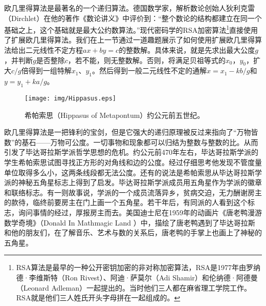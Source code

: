 \documentclass[UTF8]{article}
\begin{document}
欧几里得算法是最著名的一个递归算法。德国数学家，解析数论创始人狄利克雷（Dirchlet）在他的著作《数论讲义》中评价到：“整个数论的结构都建立在同一个基础之上，这个基础就是最大公约数算法。”现代密码学的RSA加密算法\footnote{RSA算法是最早的一种公开密钥加密的非对称加密算法，RSA是1977年由罗纳德·李维斯特（Ron Rivest）、阿迪·萨莫尔（Adi Shamir）和伦纳德·阿德曼（Leonard Adleman）一起提出的。当时他们三人都在麻省理工学院工作。RSA就是他们三人姓氏开头字母拼在一起组成的。}直接使用了扩展欧几里得算法。我们在上一节通过一道趣题展示了如何使用扩展欧几里得算法给出二元线性不定方程$ax + by = c$的整数解。具体来说，就是先求出最大公度$g$，并判断$g$是否整除$c$，若不能，则无整数解。否则，将满足贝祖等式的$x_0$，$y_0$，扩大$c/g$倍得到一组特解$x_1$、$y_1$。然后得到一般二元线性不定的通解$x = x_1 - k b / g$和$y = y_1 + k a / g$。

\begin{wrapfigure}{R}{0.4\textwidth}
 \centering
 \texttt{[image: img/Hippasus.eps]}
 \captionsetup{labelformat=empty}
 \caption{希帕索思（Hippasus of Metapontum）约公元前五世纪。}
 \label{fig:Hippasus}
\end{wrapfigure}

欧几里得算法是一把锋利的宝剑，但是它强大的递归原理被反过来指向了“万物皆数”的基石——万物可公度。一切事物和现象都可以归结为整数与整数的比。从而引发了毕达哥拉斯学派哲学思想的危机。约公元前470年左右，毕达哥拉斯学派的学生希帕索思试图寻找正方形的对角线和边的公度。经过仔细思考他发现不管度量单位取得多么小，这两条线段都无法公度。还有的说法是希帕索思从毕达哥拉斯学派的神秘五角星标志上得到了启发。毕达哥拉斯学派成员用五角星作为学派的徽章和联络标志。有一则故事说，学派的一个成员流落异乡，贫病交迫，无力酬谢房主的款待，临终前要房主在门上画一个五角星。若干年后，有同派的人看到这个标志，询问事情的经过，厚报房主而去。美国迪士尼在1959年的动画片《唐老鸭漫游数学奇境》（Donald In Mathmagic Land ）中，描绘了唐老鸭遇到了毕达哥拉斯和他的朋友们，在了解音乐、艺术与数的关系后，唐老鸭的手掌上也画上了神秘的五角星。

\begin{Exercise}
\end{Exercise}
\end{document}
